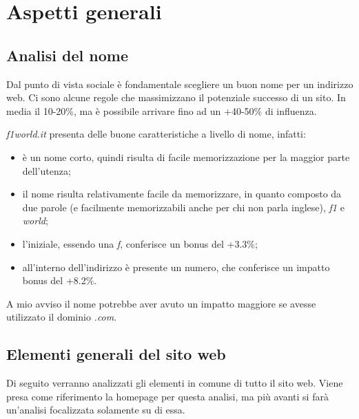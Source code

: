 \graphicspath{ {res/img/dettagli/} }

\section{Aspetti generali}

\subsection{Analisi del nome}
Dal punto di vista sociale \`e fondamentale scegliere un buon nome per un
indirizzo web. Ci sono alcune regole che massimizzano il potenziale successo di
un sito. In media il 10-20\%, ma \`e possibile arrivare fino ad un +40-50\%
di influenza.

\textit{f1world.it} presenta delle buone caratteristiche a livello di nome,
infatti:
\begin{itemize}

\item \`e un nome corto, quindi risulta di facile memorizzazione per la maggior
  parte dell'utenza;
\item il nome risulta relativamente facile da memorizzare, in quanto composto
  da due parole (e facilmente memorizzabili anche per chi non parla inglese),
  \textit{f1} e \textit{world};
\item l'iniziale, essendo una \textit{f}, conferisce un bonus del +3.3\%;
\item all'interno dell'indirizzo \`e presente un numero, che conferisce un
  impatto bonus del +8.2\%.
\end{itemize}

A mio avviso il nome potrebbe aver avuto un impatto maggiore se avesse
utilizzato il dominio \textit{.com}.


\subsection{Elementi generali del sito web}

Di seguito verranno analizzati gli elementi in comune di tutto il sito web.
Viene presa come riferimento la homepage per questa analisi, ma pi\`u avanti
si far\`a un'analisi focalizzata solamente su di essa.

